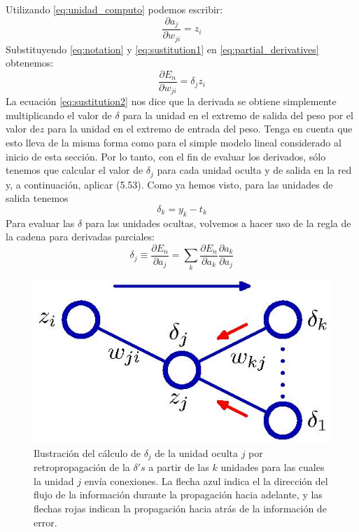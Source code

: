 \documentclass[a4paper,11pt,spanish]{book}
\begin{document}
	Utilizando \eqref{eq:unidad_computo} podemos escribir:
	\begin{equation} \label{eq:sustitution1}
	  \frac{\partial a_j}{\partial w_{ji}} = z_i
	\end{equation}
	Substituyendo \eqref{eq:notation} y \eqref{eq:sustitution1} en \eqref{eq:partial_derivatives} obtenemos:
	\begin{equation} \label{eq:sustitution2}
	  \frac{\partial E_n}{\partial w_{ji}} = \delta_j z_i
	\end{equation}
	La ecuación \eqref{eq:sustitution2} nos dice que la derivada se obtiene simplemente multiplicando el valor de $\delta$ para la unidad en el extremo de salida del peso 
	por el valor de$z$ para la unidad en el extremo de entrada del peso. Tenga en cuenta que esto lleva de la misma forma como para el simple modelo lineal considerado al inicio de esta sección.
	Por lo tanto, con el fin de evaluar los derivados, sólo tenemos que calcular el valor de $\delta_j$ para cada unidad oculta y de salida  en la red y, a continuación, aplicar (5.53). 
	Como ya hemos visto, para las unidades de salida tenemos
	\begin{equation} \label{eq:delta_salida}
	  \delta_k = y_k - t_k
	\end{equation}
	Para evaluar las $\delta$ para las unidades ocultas, volvemos a hacer uso de la regla de la cadena para derivadas parciales:
	\begin{equation}\label{eq:chain_rule}
	  \delta_j \equiv \frac{\partial E_n}{\partial a_j} = \sum_k \frac{\partial E_n}{\partial a_k} \frac{\partial a_k}{\partial a_j}
	\end{equation}
	\begin{figure}[h]
	  \begin{center}
	  \includegraphics[width=0.5\linewidth]{./img/bishop_backpropagation.jpg}
	  \end{center}
	  \caption{Ilustración del cálculo de $\delta_j$ de la unidad oculta  $j$ por retropropagación de la $\delta 's$ a partir de las $k$ unidades para las cuales la unidad $j$ envía 
	    conexiones. La flecha azul indica el la dirección del flujo de la información durante la propagación hacia adelante, y las flechas rojas indican la propagación 
	    hacia atrás de la información de error.}
	  \label{fig:backpropagation}
	\end{figure}
\end{document}
